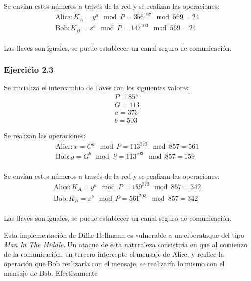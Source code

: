 \documentclass{article}
\begin{document}
                Se envían estos números a través de la red y se realizan las operaciones:
                \begin{gather*}
                    \text{Alice}: K_A = y^{a} \mod{P} = 356^{197} \mod{569} = 24 \\
                    \text{Bob}: K_B = x^{b} \mod{P} = 147^{103} \mod{569} = 24 \\
                \end{gather*}

                Las llaves son iguales, se puede establecer un canal seguro de comunicación.

            \subsubsection*{Ejercicio 2.3}

                Se inicializa el intercambio de llaves con los siguientes valores:
                \begin{gather*}
                    P = 857 \\
                    G = 113 \\
                    a = 373 \\
                    b = 503
                \end{gather*}

                Se realizan las operaciones:
                \begin{gather*}
                    \text{Alice}: x = G^{a} \mod{P} = 113^{373} \mod{857} = 561 \\
                    \text{Bob}: y = G^{b} \mod{P} = 113^{503} \mod{857} = 159 \\
                \end{gather*}

                Se envían estos números a través de la red y se realizan las operaciones:
                \begin{gather*}
                    \text{Alice}: K_A = y^{a} \mod{P} = 159^{373} \mod{857} = 342 \\
                    \text{Bob}: K_B = x^{b} \mod{P} = 561^{503} \mod{857} = 342 \\
                \end{gather*}

                Las llaves son iguales, se puede establecer un canal seguro de comunicación.
        
        Esta implementación de Diffie-Hellmann es vulnerable a un ciberataque del tipo \emph{Man In The Middle}. Un ataque de esta naturaleza consistiría en que al comienzo de la comunicación, un tercero intercepte el mensaje de Alice, y realice la operación que Bob realizaría con el mensaje, se realizaría lo mismo con el mensaje de Bob. Efectivamente 
\end{document}
